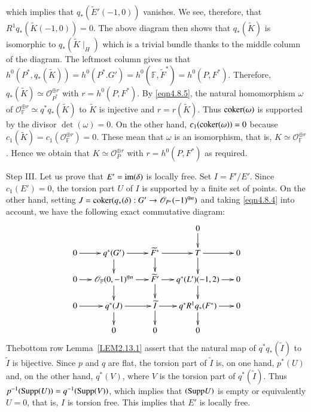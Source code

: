 \begin{Proof}
which implies that $q_{\ast}\left(\widetilde{E}'(-1,0)\right)$
vanishes. We see, therefore, that
$R^{1}q_{\ast}\left(\widetilde{K}(-1,0)\right)=0$. The above diagram
then shows that $q_{\ast}\left(\widetilde{K}\right)$ is isomorphic to
$q_{\ast}\left(\widetilde{K}\mid_{H}\right)$ which is a trivial bundle
thanks to the middle column of the diagram. The leftmost column gives
us that
$h^{0}\left(P^{\ast},q_{\ast}\left(\widetilde{K}\right)\right)=h^{0}\left(P^{\ast}.G'\right)=h^{0}\left(\mathbb{F},\widetilde{F}^{\ast}\right)=
h^{0}(P,F^{\ast})$. Therefore, $q_{\ast}\left(\widetilde{K}\right)\simeq
\mathscr{O}^{\oplus r}_{P^{\ast}}$ with $r=h^{0}(P,F^{\ast})$. By
\ref{eqn4.8.5}, the natural homomorphism $\omega$ of
$\mathscr{O}^{\oplus r}_{\mathbb{F}}\simeq
q^{\ast}q_{\ast}\left(\widetilde{K}\right)$ to $\widetilde{K}$ is
injective and $r=r\left(\widetilde{K}\right)$. Thus $\operatorname{coker} (\omega)$
is supported by the divisor $\det(\omega)=0$. On the other hand,
$c_1(\operatorname{coker}(\omega))=0$ because
$c_1\left(\widetilde{K}\right)=c_1\left(\mathscr{O}_{\mathbb{F}}^{\oplus
  r}\right)=0$. These mean that $\omega$ is an isomorphism, that is, $K\simeq
\mathscr{O}^{\oplus r}_{\mathbb{F}}$. Hence we obtain that $K\simeq
\mathscr{O}^{\oplus r}_P$ with $r=h^{0}(P,F^{\ast})$ as required. 

Step III. Let us prove that $E'=\mathrm{im}(\delta)$ is locally free. Set
$I=F'/E'$. Since $c_1(E')=0$, the torsion part $U$ of $I$ is
supported by a finite set of points. On the other hand, setting
$J=\operatorname{coker}(q_{\ast}(\delta):G'\to \mathscr{O}_{P^{\ast}}(-1)^{\oplus
  n})$ and taking \eqref{eqn4.8.4} into account, we have the following
exact commutative diagram: 
$$
\xymatrix@=.5cm{&&&0\ar[d]&\\
0\ar[r]& q^{\ast}(G')\ar[d]\ar[r]& \widetilde{F}^{\ast}\ar[d]\ar[r]&
  T\ar[d]\ar[r]&0\\
0\ar[r]&\mathscr{O}_{\mathbb{F}}(0,-1)^{\oplus
  n}\ar[d]\ar[r]&\widetilde{F}'\ar[d]\ar[r]& q^{\ast}(L')(-1,2)\ar[d]\ar[r]&0\\
0\ar[r]&q^{\ast}(J)\ar[d]\ar[r]&\widetilde{I}\ar[d]\ar[r]&q^{\ast}R^{1}q_{\ast}(F^{\ast})\ar[d]\ar[r]&0\\
&0&0&0&}
$$
The\pageoriginale bottom row Lemma~\ref{LEM2.13.1} assert that the
natural map of 
$q^{\ast}q_{\ast}\left(\widetilde{I}\right)$ to $\widetilde{I}$ is
bijective. Since $p$ and $q$ are flat, the torsion part of
$\widetilde{I}$ is, on 
one hand, $p^{\ast}(U)$ and, on the other hand, $q^{\ast}(V)$, where
$V$ is the torsion part of $q^{\ast}\left(\widetilde{I}\right)$. Thus
$p^{-1}(\mathrm{Supp}(U))=q^{-1}(\mathrm{Supp}(V))$, which implies that
$(\mathrm{Supp} U)$ is empty or equivalently $U=0$, that is, $I$ is torsion
free. This implies that $E'$ is locally free. 


\end{Proof}
